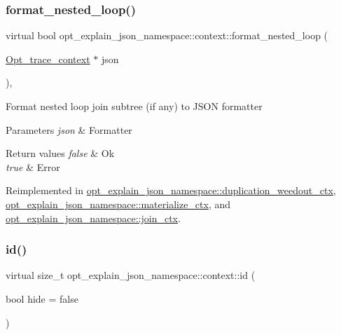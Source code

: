 \subsubsection{\texorpdfstring{format\+\_\+nested\+\_\+loop()}{format\_nested\_loop()}}
{\footnotesize\ttfamily virtual bool opt\+\_\+explain\+\_\+json\+\_\+namespace\+::context\+::format\+\_\+nested\+\_\+loop (\begin{DoxyParamCaption}\item[{\mbox{\hyperlink{classOpt__trace__context}{Opt\+\_\+trace\+\_\+context}} $\ast$}]{json }\end{DoxyParamCaption})\hspace{0.3cm}{\ttfamily [inline]}, {\ttfamily [virtual]}}

Format nested loop join subtree (if any) to J\+S\+ON formatter


\begin{DoxyParams}{Parameters}
{\em json} & Formatter\\
\hline
\end{DoxyParams}

\begin{DoxyRetVals}{Return values}
{\em false} & Ok \\
\hline
{\em true} & Error \\
\hline
\end{DoxyRetVals}


Reimplemented in \mbox{\hyperlink{classopt__explain__json__namespace_1_1duplication__weedout__ctx_af29378c61f70c4fc201f6b81d9f0129c}{opt\+\_\+explain\+\_\+json\+\_\+namespace\+::duplication\+\_\+weedout\+\_\+ctx}}, \mbox{\hyperlink{classopt__explain__json__namespace_1_1materialize__ctx_a39fa8eaa0f3b84b0f18d4d0fac41a50c}{opt\+\_\+explain\+\_\+json\+\_\+namespace\+::materialize\+\_\+ctx}}, and \mbox{\hyperlink{classopt__explain__json__namespace_1_1join__ctx_a83f0f4dde495c7ca7063692cbfbefbdf}{opt\+\_\+explain\+\_\+json\+\_\+namespace\+::join\+\_\+ctx}}.

\mbox{\label{classopt__explain__json__namespace_1_1context_a07c46bab31a35d88c13ccdca82755aaa}} 
\subsubsection{\texorpdfstring{id()}{id()}}
{\footnotesize\ttfamily virtual size\+\_\+t opt\+\_\+explain\+\_\+json\+\_\+namespace\+::context\+::id (\begin{DoxyParamCaption}\item[{bool}]{hide = {\ttfamily false} }\end{DoxyParamCaption})\hspace{0.3cm}{\ttfamily [pure virtual]}}

